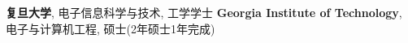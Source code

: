 %
%
%


\begin{scholarship}
					{\textbf{复旦大学}, 电子信息科学与技术, 工学学士}
					{\textbf{Georgia Institute of Technology}, 电子与计算机工程, 硕士(2年硕士1年完成)}
\end{scholarship}
